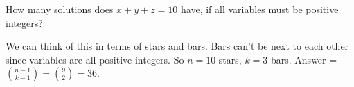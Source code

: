 \question How many solutions does $x + y + z = 10$ have, if all variables 
must be positive integers? 

\begin{solution}[.5 in]
We can think of this in terms of stars and bars. Bars can't be next to each 
other since variables are all positive integers. So $n = 10$ stars, 
$k = 3$ bars. Answer = ${n-1 \choose k-1} = {9 \choose 2} = 36$.
\end{solution}